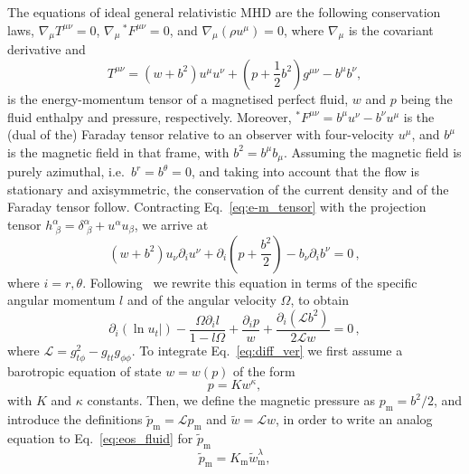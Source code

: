 \documentclass[referee]{aa}
\begin{document}
The equations of ideal general relativistic MHD are the following conservation laws, $\nabla_{\mu} T^{\mu\nu} = 0$, $\nabla_{\mu} \,^\ast F^{\mu\nu} = 0$, and 
$\nabla_{\mu} (\rho u^{\mu}) = 0$, 
where $\nabla_{\mu}$ is the covariant derivative and
\begin{equation}\label{eq:e-m_tensor}
T^{\mu\nu} = (w + b^2)u^{\mu}u^{\nu} + \left(p + \frac{1}{2}b^2\right)g^{\mu\nu} - b^{\mu}b^{\nu},
\end{equation}
is the energy-momentum tensor of a magnetised perfect fluid, $w$ and $p$ being the fluid enthalpy and pressure, respectively. 
Moreover, $^\ast F^{\mu\nu} = b^{\mu}u^{\nu} - b^{\nu}u^{\mu}$ is the (dual of the) Faraday tensor relative to an observer with 
four-velocity $u^{\mu}$, and $b^{\mu}$ is the magnetic field in that frame, with
$b^2=b^{\mu}b_{\mu}$. Assuming the magnetic field is purely azimuthal, i.e.~$b^r = b^{\theta} = 0$,
and taking into account that the flow is stationary and axisymmetric, the conservation of the current density and of the Faraday tensor follow. Contracting Eq.~\eqref{eq:e-m_tensor} with the projection tensor $h^{\alpha}_{\,\,\beta} = \delta^{\alpha}_{\,\,\beta} + u^{\alpha}u_{\beta}$, we arrive at
\begin{equation}
(w + b^2)u_{\nu}\partial_i u^{\nu} + \partial_i\left(p + \frac{b^2}{2}\right) - b_{\nu}\partial_i b^{\nu}=0\,,
\end{equation}
where $i = r, \theta$. Following~\cite{Komissarov:2006} we rewrite this equation in terms of the specific angular momentum $l$ and of the angular velocity $\Omega$, to obtain
\begin{equation}\label{eq:diff_ver}
\partial_i(\ln u_t|) - \frac{\Omega \partial_i l}{1-l\Omega} + \frac{\partial_i p}{w} + \frac{\partial_i(\mathcal{L}b^2)}{2\mathcal{L}w} = 0\,,
\end{equation}
where $\mathcal{L} = g_{t\phi}^2 - g_{tt}g_{\phi\phi}$.
To integrate Eq.~\eqref{eq:diff_ver} we first assume a barotropic equation of state $w = w(p)$ of the form
\begin{equation}\label{eq:eos_fluid}
p = K w^{\kappa},
\end{equation}
with $K$ and $\kappa$ constants.
Then, we define the magnetic pressure as $p_{\mathrm{m}} = b^2/2$, and introduce the definitions $\tilde{p}_{\mathrm{m}} = \mathcal{L} p_{\mathrm{m}}$ and $\tilde{w} = \mathcal{L} w$, in order to write an analog equation to Eq.~\eqref{eq:eos_fluid} for $\tilde{p}_{\mathrm{m}}$~\citep{Komissarov:2006}
\begin{equation}\label{eq:eos_mag_tilde}
\tilde{p}_{\mathrm{m}} = K_{\mathrm{m}} \tilde{w}_{\mathrm{m}}^{\lambda
},
\end{equation}
\end{document}
